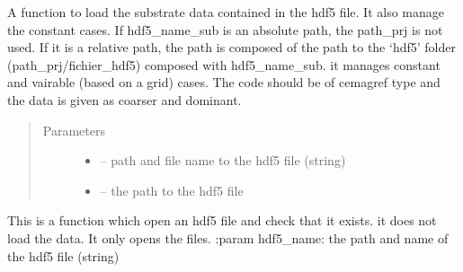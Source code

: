 \documentclass[letterpaper,10pt,english]{sphinxmanual}
\begin{document}
\begin{fulllineitems}
\label{\detokenize{index:src.load_hdf5.load_hdf5_sub}}
A function to load the substrate data contained in the hdf5 file. It also manage
the constant cases. If hdf5\_name\_sub is an absolute path, the path\_prj is not used. If it is a relative path,
the path is composed of the path to the `hdf5' folder (path\_prj/fichier\_hdf5) composed with hdf5\_name\_sub. it manages constant and
vairable (based on a grid) cases. The code should be of cemagref type and the data is given as coarser and dominant.
\begin{quote}\begin{description}
\item[{Parameters}] \leavevmode\begin{itemize}
\item {} 
 -- path and file name to the hdf5 file (string)

\item {} 
 -- the path to the hdf5 file

\end{itemize}

\end{description}\end{quote}

\end{fulllineitems}


\begin{fulllineitems}
\label{\detokenize{index:src.load_hdf5.open_hdf5}}
This is a function which open an hdf5 file and check that it exists. it does not load the data. It only opens the
files.
:param hdf5\_name: the path and name of the hdf5 file (string)

\end{fulllineitems}

\end{document}
